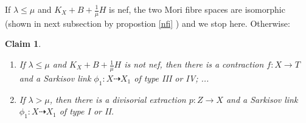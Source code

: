 \documentclass{article}
\newtheorem{claim}[defn]{Claim}
\begin{document}
If $ \lambda\leqslant\mu $ and $ K_X+B+\frac{1}{\mu}H $ is nef, the two Mori fibre spaces are isomorphic  (shown in next subsection by propostion \ref{nfi} ) and we stop here. Otherwise:
\begin{claim}
  \begin{enumerate}[A]
  \item If $ \lambda\leqslant\mu $ and $ K_X+B+\frac{1}{\mu}H $ is not nef, then there is a contraction $f:X \to T$ and a Sarkisov link $\phi_{1}:X\dashrightarrow X_{1}$ of type III or IV;  ...
    \item  If $ \lambda>\mu $, then there is a divisorial extraction $p:Z\to X$ and a Sarkisov link $\phi_{1}:X\dashrightarrow X_{1}$ of type I or II.

\end{enumerate} 
\end{claim}
\end{document}

